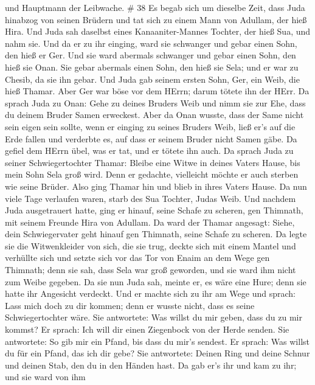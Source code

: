 und Hauptmann der Leibwache. \# 38  Es begab sich um
dieselbe Zeit, dass Juda hinabzog von seinen Brüdern und tat sich zu
einem Mann von Adullam, der hieß Hira.  Und Juda sah
daselbst eines Kanaaniter-Mannes Tochter, der hieß Sua, und nahm sie.
Und da er zu ihr einging,  ward sie schwanger und gebar
einen Sohn, den hieß er Ger.  Und sie ward abermals
schwanger und gebar einen Sohn, den hieß sie Onan.  Sie
gebar abermals einen Sohn, den hieß sie Sela; und er war zu Chesib, da
sie ihn gebar.  Und Juda gab seinem ersten Sohn, Ger, ein
Weib, die hieß Thamar.  Aber Ger war böse vor dem HErrn;
darum tötete ihn der HErr.  Da sprach Juda zu Onan: Gehe zu
deines Bruders Weib und nimm sie zur Ehe, dass du deinem Bruder Samen
erweckest.  Aber da Onan wusste, dass der Same nicht sein
eigen sein sollte, wenn er einging zu seines Bruders Weib, ließ er's auf
die Erde fallen und verderbte es, auf dass er seinem Bruder nicht Samen
gäbe.  Da gefiel dem HErrn übel, was er tat, und er tötete
ihn auch.  Da sprach Juda zu seiner Schwiegertochter
Thamar: Bleibe eine Witwe in deines Vaters Hause, bis mein Sohn Sela
groß wird. Denn er gedachte, vielleicht möchte er auch sterben wie seine
Brüder. Also ging Thamar hin und blieb in ihres Vaters Hause.
 Da nun viele Tage verlaufen waren, starb des Sua Tochter,
Judas Weib. Und nachdem Juda ausgetrauert hatte, ging er hinauf, seine
Schafe zu scheren, gen Thimnath, mit seinem Freunde Hira von Adullam.
 Da ward der Thamar angesagt: Siehe, dein Schwiegervater
geht hinauf gen Thimnath, seine Schafe zu scheren.  Da
legte sie die Witwenkleider von sich, die sie trug, deckte sich mit
einem Mantel und verhüllte sich und setzte sich vor das Tor von Enaim an
dem Wege gen Thimnath; denn sie sah, dass Sela war groß geworden, und
sie ward ihm nicht zum Weibe gegeben.  Da sie nun Juda sah,
meinte er, es wäre eine Hure; denn sie hatte ihr Angesicht verdeckt.
 Und er machte sich zu ihr am Wege und sprach: Lass mich
doch zu dir kommen; denn er wusste nicht, dass es seine Schwiegertochter
wäre. Sie antwortete: Was willst du mir geben, dass du zu mir kommst?
 Er sprach: Ich will dir einen Ziegenbock von der Herde
senden. Sie antwortete: So gib mir ein Pfand, bis dass du mir's sendest.
 Er sprach: Was willst du für ein Pfand, das ich dir gebe?
Sie antwortete: Deinen Ring und deine Schnur und deinen Stab, den du in
den Händen hast. Da gab er's ihr und kam zu ihr; und sie ward von ihm
